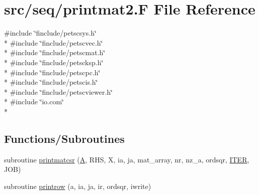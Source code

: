 \hypertarget{seq_2printmat2_8_f}{\section{src/seq/printmat2.F File Reference}
\label{seq_2printmat2_8_f}
}
{\ttfamily \#include \char`\"{}finclude/petscsys.\-h\char`\"{}}\\*
{\ttfamily \#include \char`\"{}finclude/petscvec.\-h\char`\"{}}\\*
{\ttfamily \#include \char`\"{}finclude/petscmat.\-h\char`\"{}}\\*
{\ttfamily \#include \char`\"{}finclude/petscksp.\-h\char`\"{}}\\*
{\ttfamily \#include \char`\"{}finclude/petscpc.\-h\char`\"{}}\\*
{\ttfamily \#include \char`\"{}finclude/petscis.\-h\char`\"{}}\\*
{\ttfamily \#include \char`\"{}finclude/petscviewer.\-h\char`\"{}}\\*
{\ttfamily \#include \char`\"{}io.\-com\char`\"{}}\\*
\subsection*{Functions/\-Subroutines}
\begin{DoxyCompactItemize}
\item 
subroutine \hyperlink{seq_2printmat2_8_f_a3d606242ecda94a05ac2bd0d4108a356}{printmatcsr} (\hyperlink{ibc2_8com_ad2108d58343608772fff791c23da58f5}{A}, R\-H\-S, X, ia, ja, mat\-\_\-array, nr, nz\-\_\-a, ordsqr, \hyperlink{conv_8com_a5e8268d7a99a27a3889882b8cb685176}{I\-T\-E\-R}, J\-O\-B)
\item 
subroutine \hyperlink{seq_2printmat2_8_f_ac7291e9672c04990f0d3da5e93f00cc3}{printrow} (a, ia, ja, ir, ordsqr, iwrite)
\end{DoxyCompactItemize}


